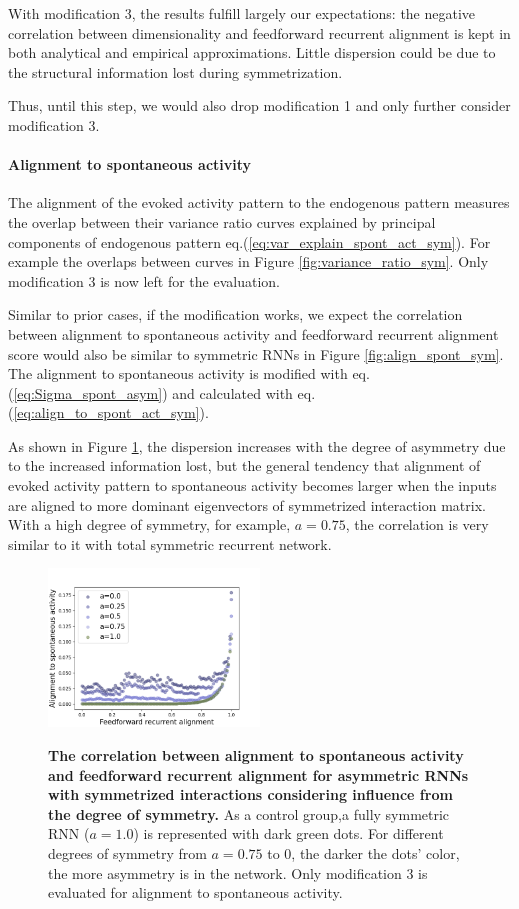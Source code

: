 \documentclass[11pt]{article}
\begin{document}
	With modification 3, the results fulfill largely our expectations: the negative correlation between dimensionality and feedforward recurrent alignment is kept in both analytical and empirical approximations. Little dispersion could be due to the structural information lost during symmetrization. 
	
	Thus, until this step, we would also drop modification 1 and only further consider modification 3. 
	
	\paragraph{Alignment to spontaneous activity}
	The alignment of the evoked activity pattern to the endogenous pattern measures the overlap between their variance ratio curves explained by principal components of endogenous pattern eq.(\ref{eq:var_explain_spont_act_sym}). For example the overlaps between curves in Figure \ref{fig:variance_ratio_sym}. Only modification 3 is now left for the evaluation. 
	
	Similar to prior cases, if the modification works, we expect the correlation between alignment to spontaneous activity and feedforward recurrent alignment score would also be similar to symmetric RNNs in Figure \ref{fig:align_spont_sym}. The alignment to spontaneous activity is modified with eq.(\ref{eq:Sigma_spont_asym}) and calculated with eq.(\ref{eq:align_to_spont_act_sym}). 
	
	As shown in Figure \ref{fig:align_to_spont_asym}, the dispersion increases with the degree of asymmetry due to the increased information lost, but the general tendency that alignment of evoked activity pattern to spontaneous activity becomes larger when the inputs are aligned to more dominant eigenvectors of symmetrized interaction matrix. With a high degree of symmetry, for example, $a = 0.75$, the correlation is very similar to it with total symmetric recurrent network.
	
	\begin{figure} 
		\centering
		\caption{\textbf{The correlation between alignment to spontaneous activity and feedforward recurrent alignment for asymmetric RNNs with symmetrized interactions considering influence from the degree of symmetry.} As a control group,a fully symmetric RNN ($a=1.0$) is represented with dark green dots. For different degrees of symmetry from $a = 0.75$ to $0$, the darker the dots' color, the more asymmetry is in the network. Only modification 3 is evaluated for alignment to spontaneous activity.}
		\includegraphics[width=0.5\textwidth]{../figures/align_to_spont_asym_symmetrized_rescaled.png}
		\label{fig:align_to_spont_asym}
	\end{figure}
\end{document}
